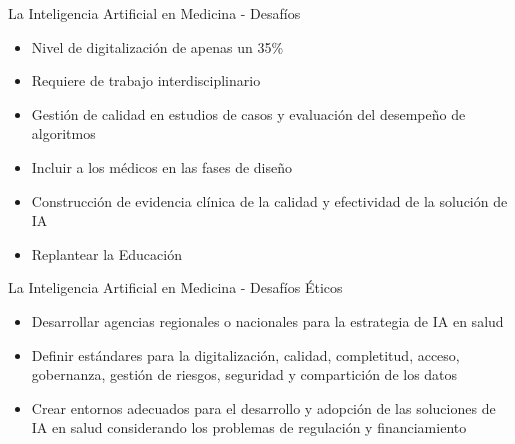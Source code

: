 \documentclass{beamer}
\begin{document}
\begin{frame}{La Inteligencia Artificial en Medicina - Desafíos}
    \begin{itemize}
    \item Nivel de digitalización de apenas un 35\%
    \item Requiere de trabajo interdisciplinario
    \item Gestión de calidad en estudios de casos y evaluación del desempeño de algoritmos
    \item Incluir a los médicos en las fases de diseño
    \item Construcción de evidencia clínica de la calidad y efectividad de la solución de IA
    \item Replantear la Educación
    
    
\end{itemize}

\end{frame}

\begin{frame}{La Inteligencia Artificial en Medicina - Desafíos Éticos}
    \begin{itemize}
    \item Desarrollar agencias regionales o nacionales para la estrategia de IA en salud
    \item Definir estándares para la digitalización, calidad, completitud, acceso, gobernanza, gestión de riesgos, seguridad y compartición de los datos
    \item Crear entornos adecuados para el desarrollo y adopción de las soluciones de IA en salud considerando los problemas de regulación y financiamiento    
\end{itemize}

\end{frame}
\end{document}
